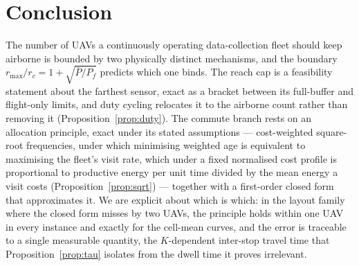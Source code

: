 \documentclass[journal,outdir=./]{IEEEtran}
\newcommand{\rmax}{r_{\max}}
\newcommand{\rc}{r_{c}}
\newcommand{\Pbar}{\bar{P}}
\newcommand{\Pf}{P_{f}}
\begin{document}
\section{Conclusion}\label{sec:conc}
The number of UAVs a continuously operating data-collection fleet should keep airborne is bounded by two physically distinct mechanisms, and the boundary $\rmax/\rc=1+\sqrt{\Pbar/\Pf}$ predicts which one binds. The reach cap is a feasibility statement about the farthest sensor, exact as a bracket between its full-buffer and flight-only limits, and duty cycling relocates it to the airborne count rather than removing it (Proposition~\ref{prop:duty}). The commute branch rests on an allocation principle, exact under its stated assumptions --- cost-weighted square-root frequencies, under which minimising weighted age is equivalent to maximising the fleet's visit rate, which under a fixed normalised cost profile is proportional to productive energy per unit time divided by the mean energy a visit costs (Proposition~\ref{prop:sqrt}) --- together with a first-order closed form that approximates it. We are explicit about which is which: in the layout family where the closed form misses by two UAVs, the principle holds within one UAV in every instance and exactly for the cell-mean curves, and the error is traceable to a single measurable quantity, the $K$-dependent inter-stop travel time that Proposition~\ref{prop:tau} isolates from the dwell time it proves irrelevant.
\end{document}
